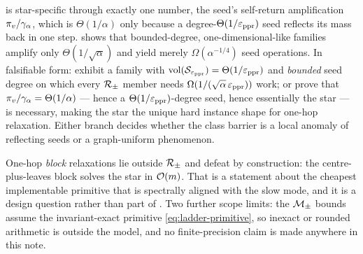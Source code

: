 \begin{problem}
\label{open:ladder-beyond-star}
 is star-specific through exactly one
number, the seed's self-return amplification $\pi_{v}/\gamma_{\alpha}$, which is
$\Theta(1/\alpha)$ only because a degree-$\Theta(1/\varepsilon_{\mathrm{ppr}})$ seed reflects its
mass back in one step.  shows that
bounded-degree, one-dimensional-like families amplify only
$\Theta(1/\sqrt\alpha)$ and yield merely $\Omega(\alpha^{-1/4})$ seed
operations. In falsifiable form: exhibit a family with
$\operatorname{vol}(\mathcal S_{\varepsilon_{\mathrm{ppr}}})=\Theta(1/\varepsilon_{\mathrm{ppr}})$ and \emph{bounded} seed degree on which
every $\mathcal{R}_{\pm}$ member needs $\Omega(1/(\sqrt\alpha\,\varepsilon_{\mathrm{ppr}}))$ work; or prove
that $\pi_{v}/\gamma_{\alpha}=\Theta(1/\alpha)$ --- hence a
$\Theta(1/\varepsilon_{\mathrm{ppr}})$-degree seed, hence essentially the star --- is necessary,
making the star the unique hard instance shape for one-hop relaxation.
Either branch decides whether the class barrier is a local anomaly of
reflecting seeds or a graph-uniform phenomenon.
\end{problem}

\begin{remark}
\label{rem:ladder-block-scope}
One-hop \emph{block} relaxations lie outside $\mathcal{R}_{\pm}$ and defeat
 by construction: the centre-plus-leaves block
solves the star in $\mathcal{O}(m)$. That is a statement about the cheapest
implementable primitive that is spectrally aligned with the slow mode, and it
is a design question rather than part of . Two
further scope limits: the $\mathcal{M}_{\pm}$ bounds assume the invariant-exact primitive
\eqref{eq:ladder-primitive}, so inexact or rounded arithmetic is outside the
model, and no finite-precision claim is made anywhere in this note.
\end{remark}

